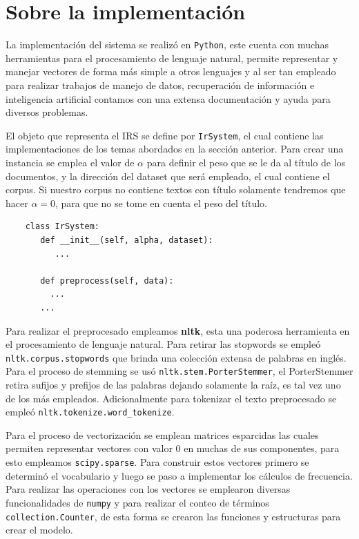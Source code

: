 \documentclass[runningheads,a4paper]{llncs}
\begin{document}
\section{Sobre la implementación} %

La implementación del sistema se realizó en \verb*|Python|, este cuenta con muchas herramientas para el procesamiento de lenguaje natural, permite representar y manejar vectores de forma más simple a otros lenguajes y al ser tan empleado para realizar trabajos de manejo de datos, recuperación de información e inteligencia artificial contamos con una extensa documentación y ayuda para diversos problemas.

El objeto que representa el IRS se define por \verb*|IrSystem|, el cual contiene las implementaciones de los temas abordados en la sección anterior. Para crear una instancia se emplea el valor de $\alpha$ para definir el peso que se le da al título de los documentos, y la dirección del dataset que será empleado, el cual contiene el corpus. Si nuestro corpus no contiene textos con título solamente tendremos que hacer $\alpha = 0$, para que no se tome en cuenta el peso del título.

\noindent
%
\begin{verbatim}
	class IrSystem:	   
	   def __init__(self, alpha, dataset):
	      ...
	      
	   def preprocess(self, data):
	     ...	     
	   ...
\end{verbatim}
%
\noindent

Para realizar el preprocesado empleamos \textbf{nltk}, esta una poderosa herramienta en el procesamiento de lenguaje natural. Para retirar las stopwords se empleó \verb*|nltk.corpus.stopwords| que brinda una colección extensa de palabras en inglés. Para el proceso de stemming se usó \verb*|nltk.stem.PorterStemmer|, el PorterStemmer retira sufijos y prefijos de las palabras dejando solamente la raíz, es tal vez uno de los más empleados. Adicionalmente para tokenizar el texto preprocesado se empleó \verb*|nltk.tokenize.word_tokenize|.

Para el proceso de vectorización se emplean matrices esparcidas las cuales permiten representar vectores con valor 0 en muchas de sus componentes, para esto empleamos \verb*|scipy.sparse|. Para construir estos vectores primero se determinó el vocabulario y luego se paso a implementar los cálculos de frecuencia. Para realizar las operaciones con los vectores se emplearon diversas funcionalidades de \verb*|numpy| y para realizar el conteo de términos \verb*|collection.Counter|, de esta forma se crearon las funciones y estructuras para crear el modelo.
\end{document}
